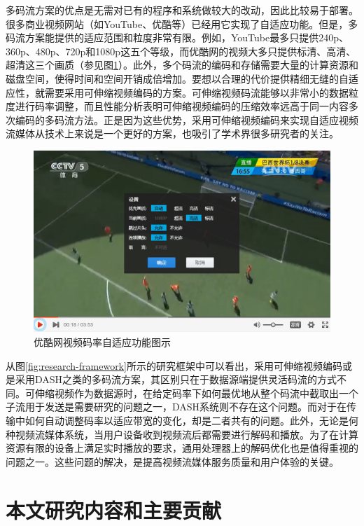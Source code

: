 多码流方案的优点是无需对已有的程序和系统做较大的改动，因此比较易于部署\supercite{Bouten2014}。很多商业视频网站（如YouTube、优酷等）已经用它实现了自适应功能。但是，多码流方案能提供的适应范围和粒度非常有限。例如，YouTube最多只提供240p、360p、480p、720p和1080p这五个等级，而优酷网的视频大多只提供标清、高清、超清这三个画质（参见图\ref{fig:13}）。此外，多个码流的编码和存储需要大量的计算资源和磁盘空间，使得时间和空间开销成倍增加。要想以合理的代价提供精细无缝的自适应性，就需要采用可伸缩视频编码的方案。可伸缩视频码流能够以非常小的数据粒度进行码率调整，而且性能分析表明可伸缩视频编码的压缩效率远高于同一内容多次编码的多码流方法\supercite{SVC-Performance}。正是因为这些优势，采用可伸缩视频编码来实现自适应视频流媒体从技术上来说是一个更好的方案，也吸引了学术界很多研究者的关注\supercite{Chuah2012, Zhu2013, Dan2013, Yang2014, Cicalo2014}。

\begin{figure}[t]
	\centering
	\includegraphics[width = 1.0\linewidth]{clip/13.png}
	\caption{优酷网视频码率自适应功能图示\label{fig:13}}
\end{figure}

从图\ref{fig:research-framework}所示的研究框架中可以看出，采用可伸缩视频编码或是采用DASH之类的多码流方案，其区别只在于数据源端提供灵活码流的方式不同。可伸缩视频作为数据源时，在给定码率下如何最优地从整个码流中截取出一个子流用于发送是需要研究的问题之一，DASH系统则不存在这个问题。而对于在传输中如何自动调整码率以适应带宽的变化，却是二者共有的问题。此外，无论是何种视频流媒体系统，当用户设备收到视频流后都需要进行解码和播放。为了在计算资源有限的设备上满足实时播放的要求，通用处理器上的解码优化也是值得重视的问题之一。这些问题的解决，是提高视频流媒体服务质量和用户体验的关键。

\section{本文研究内容和主要贡献}

